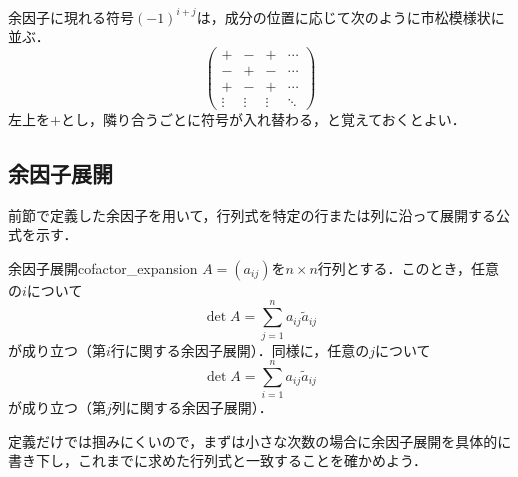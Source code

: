 余因子に現れる符号$(-1)^{i+j}$は，成分の位置に応じて次のように市松模様状に並ぶ．
\[
\begin{pmatrix}
  + & - & + & \cdots \\
  - & + & - & \cdots \\
  + & - & + & \cdots \\
  \vdots & \vdots & \vdots & \ddots
\end{pmatrix}
\]
左上を$+$とし，隣り合うごとに符号が入れ替わる，と覚えておくとよい．


\subsection{余因子展開}

前節で定義した余因子を用いて，行列式を特定の行または列に沿って展開する公式を示す．


\begin{prop}{余因子展開}{cofactor_expansion}
  $A = (a_{ij})$を$n \times n$行列とする．このとき，任意の$i$について
  \[
  \det A = \sum_{j=1}^{n} a_{ij} \tilde{a}_{ij}
  \]
  が成り立つ（第$i$行に関する余因子展開）．同様に，任意の$j$について
  \[
  \det A = \sum_{i=1}^{n} a_{ij} \tilde{a}_{ij}
  \]
  が成り立つ（第$j$列に関する余因子展開）．
\end{prop}

定義だけでは掴みにくいので，まずは小さな次数の場合に余因子展開を具体的に書き下し，これまでに求めた行列式と一致することを確かめよう．

